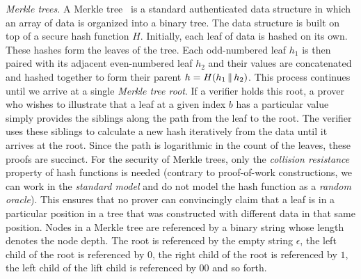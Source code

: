 \noindent
\emph{Merkle trees.} A Merkle tree~\cite{merkle} is a standard authenticated data structure
in which an array of data is organized into a binary tree. The data structure is built on
top of a secure hash function $H$. Initially, each leaf of data is hashed on its own. These hashes
form the leaves of the tree. Each odd-numbered leaf $h_1$ is then paired with its adjacent even-numbered
leaf $h_2$ and their values are concatenated and hashed together to form their parent
$h = H(h_1 \,\|\, h_2)$. This process continues until we arrive at a single \emph{Merkle tree root}.
If a verifier holds this root, a prover who wishes to illustrate that a leaf at a given index $b$
has a particular value simply provides the siblings along the path from the leaf to the root.
The verifier uses these siblings to calculate a new hash iteratively from the data until it
arrives at the root. Since the path is logarithmic in the count of the leaves, these proofs are
succinct. For the security of Merkle trees, only the \emph{collision resistance} property of hash
functions is needed (contrary to proof-of-work constructions, we can work in the \emph{standard model}
and do not model the hash function as a \emph{random oracle}). This ensures that no prover can
convincingly claim that a leaf is in a particular position in a tree that was constructed with different
data in that same position. Nodes in a Merkle tree are referenced by a binary string whose
length denotes the node depth. The root is referenced by the empty string $\epsilon$, the
left child of the root is referenced by $0$, the right child of the root is referenced by
$1$, the left child of the lift child is referenced by $00$ and so forth.
